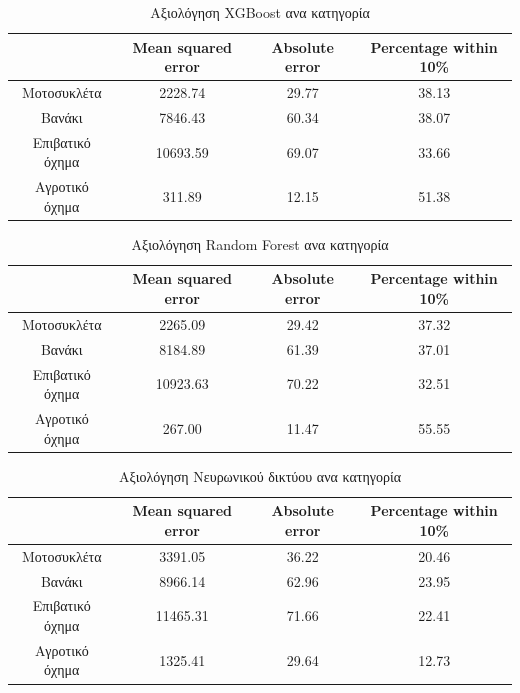 \documentclass{llncs}
\begin{document}
\begin{table}
    \centering
    \begin{tabular}{|c|c|c|c|} %
        \hline
         &Mean squared error & Absolute error & Percentage within 10\% \\ %
        \hline
        Μοτοσυκλέτα & 2228.74 & 29.77 & 38.13 \\
        Βανάκι & 7846.43 & 60.34 & 38.07 \\
        Επιβατικό όχημα & 10693.59 & 69.07 & 33.66 \\
        Αγροτικό όχημα & 311.89 & 12.15 & 51.38 \\
        \hline
    \end{tabular}
    \caption{Αξιολόγηση XGBoost ανα κατηγορία}
    \label{tab:XGBoost_cat_individual}
\end{table}

\begin{table}
    \centering
    \begin{tabular}{|c|c|c|c|} %
        \hline
         &Mean squared error & Absolute error & Percentage within 10\% \\ %
        \hline
        Μοτοσυκλέτα & 2265.09 & 29.42 & 37.32 \\
        Βανάκι & 8184.89 & 61.39 & 37.01 \\
        Επιβατικό όχημα & 10923.63 & 70.22 & 32.51 \\
        Αγροτικό όχημα & 267.00 & 11.47 & 55.55 \\
        \hline
    \end{tabular}
    \caption{Αξιολόγηση Random Forest ανα κατηγορία}
    \label{tab:RandomForest_cat_individual}
\end{table}

\begin{table}
    \centering
    \begin{tabular}{|c|c|c|c|} %
        \hline
         &Mean squared error & Absolute error & Percentage within 10\% \\ %
        \hline
        Μοτοσυκλέτα & 3391.05 & 36.22 & 20.46 \\
        Βανάκι & 8966.14 & 62.96 & 23.95 \\
        Επιβατικό όχημα & 11465.31 & 71.66 & 22.41 \\
        Αγροτικό όχημα & 1325.41 & 29.64 & 12.73 \\
        \hline
    \end{tabular}
    \caption{Αξιολόγηση Νευρωνικού δικτύου ανα κατηγορία}
    \label{tab:neural_network_cat_individual}
\end{table}
\end{document}
